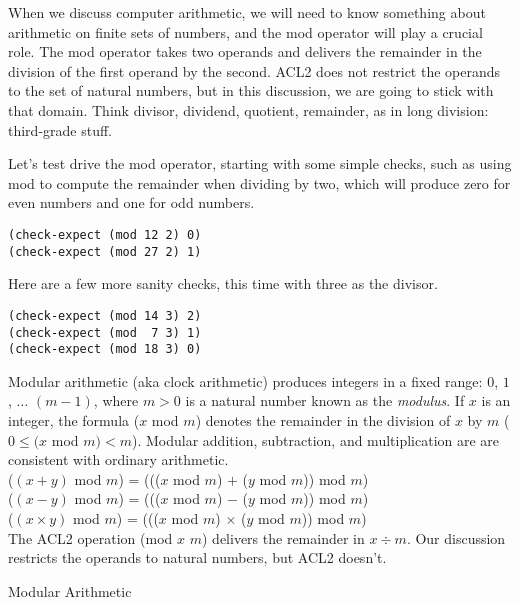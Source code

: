 When we discuss computer arithmetic, we will need to know something about
arithmetic on finite sets of numbers,  and the
\label{mod-function}mod
operator will play a crucial role.
The mod operator takes two operands and
delivers the remainder in the division of the first operand by the second.
ACL2 does not restrict the operands to the set of natural numbers,
but in this discussion, we are going to stick with that domain.
Think
divisor, dividend, quotient, remainder,
as in
long division:
third-grade stuff.

Let's test drive the \textsf{mod} operator, starting with
some simple checks, such as using \textsf{mod}
to compute the remainder when dividing by two,
which will produce zero for even numbers and one for odd numbers.

\begin{Verbatim}
(check-expect (mod 12 2) 0)
(check-expect (mod 27 2) 1)
\end{Verbatim}

Here are a few more sanity checks, this time with three as the divisor.

\begin{Verbatim}
(check-expect (mod 14 3) 2)
(check-expect (mod  7 3) 1)
(check-expect (mod 18 3) 0)
\end{Verbatim}

\begin{aside}
Modular
arithmetic (aka clock arithmetic)
produces integers in a fixed range: $0$, $1$, $\dots$ $(m - 1)$,
where $m > 0$ is a natural number known as the
\emph{modulus}.
If $x$ is an integer, the formula ($x$ mod $m$) denotes
the remainder in the division of $x$ by $m$
($0 \leq (x$ mod $m) < m$).
Modular addition, subtraction, and multiplication are
are consistent with ordinary arithmetic.\\
\hspace*{15mm}($(x + y)$ mod $m$) = ((($x$ mod $m$) $+$ ($y$ mod $m$)) mod $m$) \\
\hspace*{15mm}($(x - y)$ mod $m$) = ((($x$ mod $m$) $-$ ($y$ mod $m$)) mod $m$) \\
\hspace*{15mm}($(x \times y)$ mod $m$) = ((($x$ mod $m$) $\times$ ($y$ mod $m$)) mod $m$)\\
The ACL2 operation
(\textsf{mod} $x$ $m$) delivers the remainder in $x \div m$.
Our discussion restricts the operands to natural numbers,
but ACL2 doesn't.
\caption{Modular Arithmetic}
\label{modular-arithmetic}
\end{aside}

